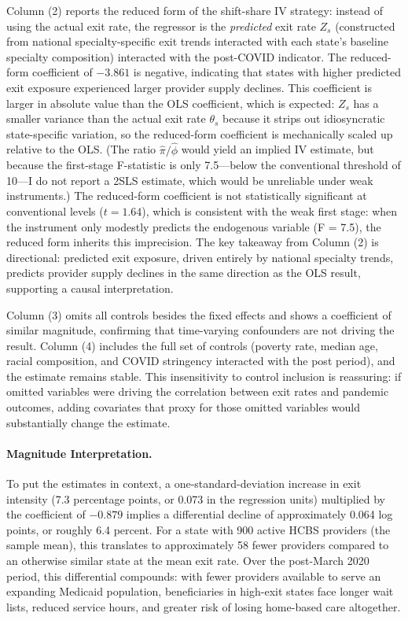 \documentclass[12pt]{article}
\begin{document}
Column (2) reports the reduced form of the shift-share IV strategy: instead of using the actual exit rate, the regressor is the \emph{predicted} exit rate $Z_s$ (constructed from national specialty-specific exit trends interacted with each state's baseline specialty composition) interacted with the post-COVID indicator. The reduced-form coefficient of $-3.861$ is negative, indicating that states with higher predicted exit exposure experienced larger provider supply declines. This coefficient is larger in absolute value than the OLS coefficient, which is expected: $Z_s$ has a smaller variance than the actual exit rate $\theta_s$ because it strips out idiosyncratic state-specific variation, so the reduced-form coefficient is mechanically scaled up relative to the OLS. (The ratio $\hat{\pi}/\hat{\phi}$ would yield an implied IV estimate, but because the first-stage F-statistic is only 7.5---below the conventional threshold of 10---I do not report a 2SLS estimate, which would be unreliable under weak instruments.) The reduced-form coefficient is not statistically significant at conventional levels ($t = 1.64$), which is consistent with the weak first stage: when the instrument only modestly predicts the endogenous variable (F = 7.5), the reduced form inherits this imprecision. The key takeaway from Column (2) is directional: predicted exit exposure, driven entirely by national specialty trends, predicts provider supply declines in the same direction as the OLS result, supporting a causal interpretation.

Column (3) omits all controls besides the fixed effects and shows a coefficient of similar magnitude, confirming that time-varying confounders are not driving the result. Column (4) includes the full set of controls (poverty rate, median age, racial composition, and COVID stringency interacted with the post period), and the estimate remains stable. This insensitivity to control inclusion is reassuring: if omitted variables were driving the correlation between exit rates and pandemic outcomes, adding covariates that proxy for those omitted variables would substantially change the estimate.



\paragraph{Magnitude Interpretation.} To put the estimates in context, a one-standard-deviation increase in exit intensity (7.3 percentage points, or 0.073 in the regression units) multiplied by the coefficient of $-0.879$ implies a differential decline of approximately 0.064 log points, or roughly 6.4 percent. For a state with 900 active HCBS providers (the sample mean), this translates to approximately 58 fewer providers compared to an otherwise similar state at the mean exit rate. Over the post-March 2020 period, this differential compounds: with fewer providers available to serve an expanding Medicaid population, beneficiaries in high-exit states face longer wait lists, reduced service hours, and greater risk of losing home-based care altogether.
\end{document}
